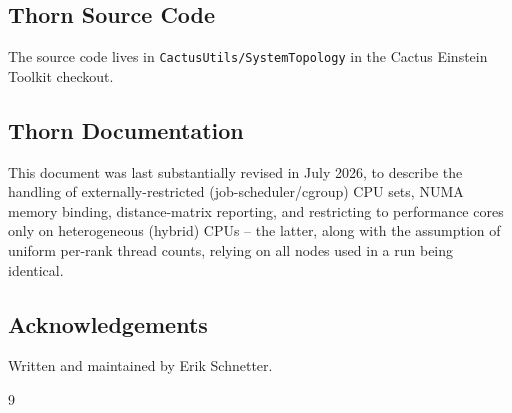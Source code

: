 \subsection{Thorn Source Code}

The source code lives in \texttt{CactusUtils/SystemTopology} in the
Cactus Einstein Toolkit checkout.

\subsection{Thorn Documentation}

This document was last substantially revised in July 2026, to describe
the handling of externally-restricted (job-scheduler/cgroup) CPU sets,
NUMA memory binding, distance-matrix reporting, and restricting to
performance cores only on heterogeneous (hybrid) CPUs -- the latter,
along with the assumption of uniform per-rank thread counts, relying on
all nodes used in a run being identical.

\subsection{Acknowledgements}

Written and maintained by Erik Schnetter.


\begin{thebibliography}{9}

\end{thebibliography}



